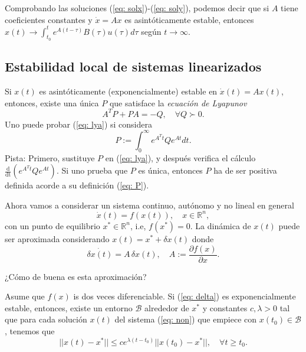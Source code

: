 Comprobando las soluciones (\ref{eq: solx})-(\ref{eq: soly}), podemos decir que si $A$ tiene coeficientes constantes y $\dot x = Ax$ es asintóticamente estable, entonces $x(t) \to \int_{t_0}^t e^{A(t-\tau)}B(\tau)u(\tau)d\tau$ según $t\to\infty$. 

\subsection{Estabilidad local de sistemas linearizados}\label{lyapulin}
Si $x(t)$ es asintóticamente (exponencialmente) estable en $\dot x(t) = Ax(t)$, entonces, existe una única $P$ que satisface la \emph{ecuación de Lyapunov}
\begin{equation}
A^TP + PA = -Q, \quad \forall Q \succ 0.
	\label{eq: lya}
\end{equation}
Uno puede probar (\ref{eq: lya}) si considera
\begin{equation}
	P:= \int_0^\infty e^{A^Tt}Qe^{At}dt.
	\label{eq: P}
\end{equation}
Pista: Primero, sustituye $P$ en (\ref{eq: lya}), y después verifica el cálculo  $\frac{\mathrm{d}}{\mathrm{dt}}\left(e^{A^Tt}Qe^{At}\right)$. Si uno prueba que $P$ es única, entonces $P$ ha de ser positiva definida acorde a su definición (\ref{eq: P}).

Ahora vamos a considerar un sistema continuo, autónomo y no lineal en general
\begin{equation}
	\dot x(t) = f(x(t)), \quad x\in\mathbb{R}^n,
	\label{eq: non}
\end{equation}
con un punto de equilibrio $x^*\in\mathbb{R}^n$, i.e, $f(x^*) = 0$. La dinámica de $x(t)$ puede ser aproximada considerando $x(t) = x^* + \delta x(t)$ donde 
\begin{equation}
	\dot{\delta x(t)} = A\,\delta x(t), \quad A:=\frac{\partial f(x)}{\partial x}.
	\label{eq: delta}
\end{equation}

¿Cómo de buena es esta aproximación?

\begin{theorem}
	\label{thm: tayl}
	Asume que $f(x)$ is dos veces diferenciable. Si (\ref{eq: delta}) es exponencialmente estable, entonces, existe un entorno $\mathcal{B}$ alrededor de $x^*$ y constantes $c, \lambda > 0$ tal que para cada solución $x(t)$ del sistema (\ref{eq: non}) que empiece con $x(t_0)\in\mathcal{B}$, tenemos que
	\begin{equation}
	||x(t) - x^*|| \leq ce^{\lambda(t-t_0)} ||x(t_0) - x^*||, \quad \forall t\geq t_0.
	\end{equation}
\end{theorem}

